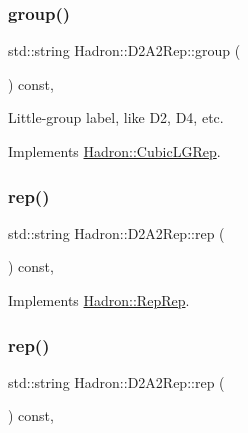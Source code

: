 \subsubsection{\texorpdfstring{group()}{group()}\hspace{0.1cm}{\footnotesize\ttfamily [3/3]}}
{\footnotesize\ttfamily std\+::string Hadron\+::\+D2\+A2\+Rep\+::group (\begin{DoxyParamCaption}{ }\end{DoxyParamCaption}) const\hspace{0.3cm}{\ttfamily [inline]}, {\ttfamily [virtual]}}

Little-\/group label, like D2, D4, etc. 

Implements \mbox{\hyperlink{structHadron_1_1CubicLGRep_a9bdb14b519a611d21379ed96a3a9eb41}{Hadron\+::\+Cubic\+L\+G\+Rep}}.

\mbox{\label{structHadron_1_1D2A2Rep_a6820f2acd27e1e6bcebbe430421b0e65}} 
\subsubsection{\texorpdfstring{rep()}{rep()}\hspace{0.1cm}{\footnotesize\ttfamily [1/3]}}
{\footnotesize\ttfamily std\+::string Hadron\+::\+D2\+A2\+Rep\+::rep (\begin{DoxyParamCaption}{ }\end{DoxyParamCaption}) const\hspace{0.3cm}{\ttfamily [inline]}, {\ttfamily [virtual]}}



Implements \mbox{\hyperlink{structHadron_1_1RepRep_ab3213025f6de249f7095892109575fde}{Hadron\+::\+Rep\+Rep}}.

\mbox{\label{structHadron_1_1D2A2Rep_a6820f2acd27e1e6bcebbe430421b0e65}} 
\subsubsection{\texorpdfstring{rep()}{rep()}\hspace{0.1cm}{\footnotesize\ttfamily [2/3]}}
{\footnotesize\ttfamily std\+::string Hadron\+::\+D2\+A2\+Rep\+::rep (\begin{DoxyParamCaption}{ }\end{DoxyParamCaption}) const\hspace{0.3cm}{\ttfamily [inline]}, {\ttfamily [virtual]}}




